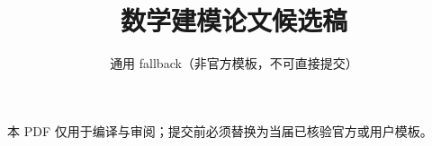 \documentclass[UTF8,11pt,a4paper]{ctexart}
\title{数学建模论文候选稿}
\author{\textcolor{FallbackGray}{通用 fallback（非官方模板，不可直接提交）}}
\date{}
\begin{document}
\maketitle
\begin{center}
  \color{FallbackGray}\small
  本 PDF 仅用于编译与审阅；提交前必须替换为当届已核验官方或用户模板。
\end{center}






\end{document}
